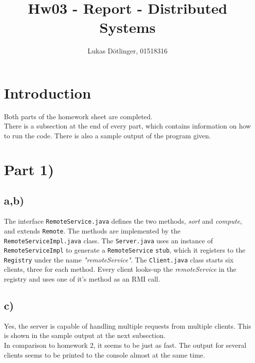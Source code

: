 \documentclass{article}
\begin{document}
  \title{Hw03 - Report - Distributed Systems}
  \date{}
  \author{Lukas Dötlinger, 01518316}
	
  \maketitle
  
  \section*{Introduction}
    
    Both parts of the homework sheet are completed.\\
    There is a subsection at the end of every part, which contains information on how to run the code. There is also a sample output of the program given.\\
	
  \section*{Part 1)}
  
    \subsection*{a,b)}
    
      The interface \texttt{RemoteService.java} defines the two methods, \textit{sort} and \textit{compute}, and extends \texttt{Remote}. The methods are implemented by the \texttt{RemoteServiceImpl.java} class. The \texttt{Server.java} uses an instance of \texttt{RemoteServiceImpl} to generate a \texttt{RemoteService} \texttt{stub}, which it registers to the \texttt{Registry} under the name \textit{"remoteService"}. The \texttt{Client.java} class starts six clients, three for each method. Every client looks-up the \textit{remoteService} in the registry and uses one of it's method as an RMI call.
      
	\subsection*{c)}
	
	  Yes, the server is capable of handling multiple requests from multiple clients. This is shown in the sample output at the next subsection.\\
	  In comparison to homework 2, it seems to be just as fast. The output for several clients seems to be printed to the console almost at the same time. 
    
\end{document}
